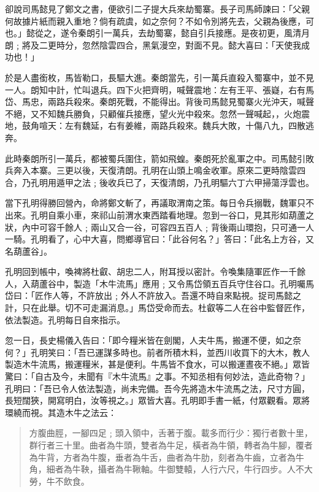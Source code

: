 卻說司馬懿見了鄭文之書，便欲引二子提大兵來劫蜀寨。長子司馬師諫曰：「父親何故據片紙而親入重地？倘有疏虞，如之奈何？不如令別將先去，父親為後應，可也。」懿從之，遂令秦朗引一萬兵，去劫蜀寨，懿自引兵接應。是夜初更，風清月朗﹔將及二更時分，忽然陰雲四合，黑氣漫空，對面不見。懿大喜曰：「天使我成功也！」

於是人盡銜枚，馬皆勒口，長驅大進。秦朗當先，引一萬兵直殺入蜀寨中，並不見一人。朗知中計，忙叫退兵。四下火把齊明，喊聲震地：左有王平、張嶷，右有馬岱、馬忠，兩路兵殺來。秦朗死戰，不能得出。背後司馬懿見蜀寨火光沖天，喊聲不絕，又不知魏兵勝負，只顧催兵接應，望火光中殺來。忽然一聲喊起，，火炮震地，鼓角喧天：左有魏延，右有姜維，兩路兵殺來。魏兵大敗，十傷八九，四散逃奔。

此時秦朗所引一萬兵，都被蜀兵圍住，箭如飛蝗。秦朗死於亂軍之中。司馬懿引敗兵奔入本寨。三更以後，天復清朗。孔明在山頭上鳴金收軍。原來二更時陰雲四合，乃孔明用遁甲之法﹔後收兵已了，天復清朗，乃孔明驅六丁六甲掃蕩浮雲也。

當下孔明得勝回營內，命將鄭文斬了，再議取渭南之策。每日令兵搦戰，魏軍只不出來。孔明自乘小車，來祁山前渭水東西踏看地理。忽到一谷口，見其形如葫蘆之狀，內中可容千餘人﹔兩山又合一谷，可容四五百人﹔背後兩山環抱，只可通一人一騎。孔明看了，心中大喜，問鄉導官曰：「此谷何名？」答曰：「此名上方谷，又名葫蘆谷」。

孔明回到帳中，喚裨將杜叡、胡忠二人，附耳授以密計。令喚集隨軍匠作一千餘人，入葫蘆谷中，製造「木牛流馬」應用﹔又令馬岱領五百兵守住谷口。孔明囑馬岱曰：「匠作人等，不許放出﹔外人不許放入。吾還不時自來點視。捉司馬懿之計，只在此舉。切不可走漏消息。」馬岱受命而去。杜叡等二人在谷中監督匠作，依法製造。孔明每日自來指示。

忽一日，長史楊儀入告曰：「即今糧米皆在劍閣，人夫牛馬，搬運不便，如之奈何？」孔明笑曰：「吾已運謀多時也。前者所積木料，並西川收買下的大木，教人製造木牛流馬，搬運糧米，甚是便利。牛馬皆不食水，可以搬運晝夜不絕。」眾皆驚曰：「自古及今，未聞有『木牛流馬』之事。不知丞相有何妙法，造此奇物？」孔明曰：「吾已令人依法製造，尚未完備。吾今先將造木牛流馬之法，尺寸方圓，長短闊狹，開寫明白，汝等視之。」眾皆大喜。孔明即手書一紙，付眾觀看。眾將環繞而視。其造木牛之法云：

\begin{quote}
方腹曲脛，一腳四足﹔頭入領中，舌著于腹。載多而行少：獨行者數十里，群行者三十里。曲者為牛頭，雙者為牛足，橫者為牛領，轉者為牛腳，覆者為牛背，方者為牛腹，垂者為牛舌，曲者為牛肋，刻者為牛齒，立者為牛角，細者為牛鞅，攝者為牛鞦軸。牛御雙轅，人行六尺，牛行四步。人不大勞，牛不飲食。
\end{quote}

